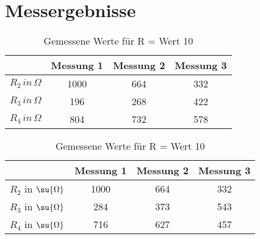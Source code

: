 



\section{Messergebnisse}

\begin{table}
  \centering
  \label{tab:MessungA}
  \caption{Gemessene Werte für R = Wert 10}
  \begin{tabular}{ c c c c }
    \toprule
     & Messung 1 & Messung 2 & Messung 3 \\
    \midrule
    $R_{2} \, in \, \Omega $ \vline & 1000 & 664 & 332 \\
    $R_{3} \, in \, \Omega $ \vline & 196 & 268 & 422  \\
    $R_{4} \, in \, \Omega $ \vline & 804 & 732 & 578  \\
    \bottomrule
  \end{tabular}
\end{table}

\begin{table}
  \centering
  \label{tab:MessungA}
  \caption{Gemessene Werte für R = Wert 10}
  \begin{tabular}{ c c c c }
    \toprule
     & Messung 1 & Messung 2 & Messung 3 \\
    \midrule
    $R_{2}$  in  $\su{\Omega} $ \vline & 1000 & 664 & 332 \\
    $R_{3}$  in  $\su{\Omega} $ \vline & 284 & 373 & 543  \\
    $R_{4}$  in  $\su{\Omega} $ \vline & 716 & 627 & 457  \\
    \bottomrule
  \end{tabular}
\end{table}


